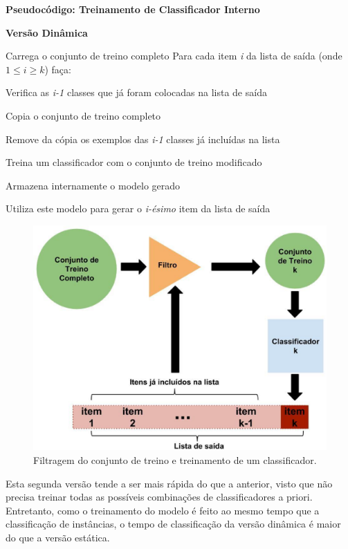 \begin{center}
\textbf{Pseudocódigo: Treinamento de Classificador Interno}

\textbf{Versão Dinâmica}
\end{center}
\hfill \break
Carrega o conjunto de treino completo\newline
Para cada item \textit{i} da lista de saída (onde $1 \leq i \geq k$) faça:

\quad Verifica as \textit{i-1} classes que já foram colocadas na lista de saída

\quad Copia o conjunto de treino completo

\quad Remove da cópia os exemplos das \textit{i-1} classes já incluídas na lista

\quad Treina um classificador com o conjunto de treino modificado

\quad Armazena internamente o modelo gerado

\quad Utiliza este modelo para gerar o \textit{i-ésimo} item da lista de saída
\hfill \break

\begin{figure}[h!]
  \includegraphics[width=\linewidth]{images/metodoproposto02.eps}
  \caption{Filtragem do conjunto de treino e treinamento de um classificador.}
  \label{fig:metodoproposto02}
\end{figure}

Esta segunda versão tende a ser mais rápida do que a anterior, visto que não precisa treinar todas as possíveis combinações de classificadores a priori. Entretanto, como o treinamento do modelo é feito ao mesmo tempo que a classificação de instâncias, o tempo de classificação da versão dinâmica é maior do que a versão estática. 

